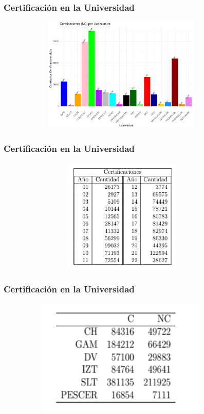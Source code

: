 \documentclass[xcolor=dvipsnames]{beamer}
\begin{document}
\begin{frame}\frametitle{Certificaci\'on en la Universidad}
\textbf{
}
\begin{figure}[H]
\centering
\includegraphics[width=10cm,height=5.5cm]{Imagenes/graficoCertificacionNFLicenciatura.pdf}
\end{figure}
\end{frame}


\begin{frame}\frametitle{Certificaci\'on en la Universidad}
\textbf{
}
\begin{figure}[H]
\centering
\includegraphics[width=10cm,height=5.5cm]{Tablas/CertificacionAnual.png}
\end{figure}
\end{frame}

\begin{frame}\frametitle{Certificaci\'on en la Universidad}
\textbf{
}
\begin{figure}[H]
\centering
\includegraphics[width=10cm,height=5.5cm]{Tablas/CertificacionFnFPlanteles.png}
\end{figure}
\end{frame}
\end{document}
